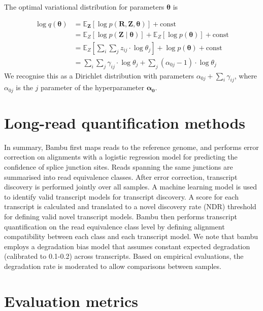 The optimal variational distribution for parameters $\boldsymbol{\theta}$ is

\begin{equation}
\begin{split}
    \log q(\boldsymbol{\theta})&=\mathbb{E}_{\boldsymbol{Z}}[\log p(\boldsymbol{R}, \boldsymbol{Z}, \boldsymbol{\theta})]+\mathrm{const} \\
    &= \mathbb{E}_{Z}[\log p(\boldsymbol{Z} \mid \boldsymbol{\theta})]+\mathbb{E}_{Z}[\log p(\boldsymbol{\theta})]+\mathrm{const} \\
    &= \mathbb{E}_{Z}\left[\sum_{i} \sum_{j} z_{i j} \cdot \log \theta_{j}\right]+\log p(\boldsymbol{\theta})+\mathrm{const} \\
    &=\sum_{i} \sum_{j} \gamma_{i j} \cdot \log \theta_{j}+\sum_{j}\left(\alpha_{0 j}-1\right) \cdot \log \theta_{j}
\end{split}
\end{equation}
We recognise this as a Dirichlet distribution with parameters $\alpha_{0 j}+\sum_{i} \gamma_{i j}$, where $\alpha_{0j}$ is the $j$ parameter of the hyperparameter $\bm{\alpha_0}$. 

\chapter{Long-read quantification methods}\label{ap:meth}

In summary, Bambu first maps reads to the reference genome, and performs error correction on alignments with a logistic regression model for predicting the confidence of splice junction sites. Reads spanning the same junctions are summarised into read equivalence classes. After error correction, transcript discovery is performed jointly over all samples. A machine learning model is used to identify valid transcript models for transcript discovery. A score for each transcript is calculated and translated to a novel discovery rate (NDR) threshold for defining valid novel transcript models. Bambu then performs transcript quantification on the read equivalence class level by defining alignment compatibility between each class and each transcript model. We note that bambu employs a degradation bias model that assumes constant expected degradation (calibrated to 0.1-0.2) across transcripts. Based on empirical evaluations, the degradation rate is moderated to allow comparisons between samples.   


\chapter{Evaluation metrics}\label{ap:eval-metrics}

